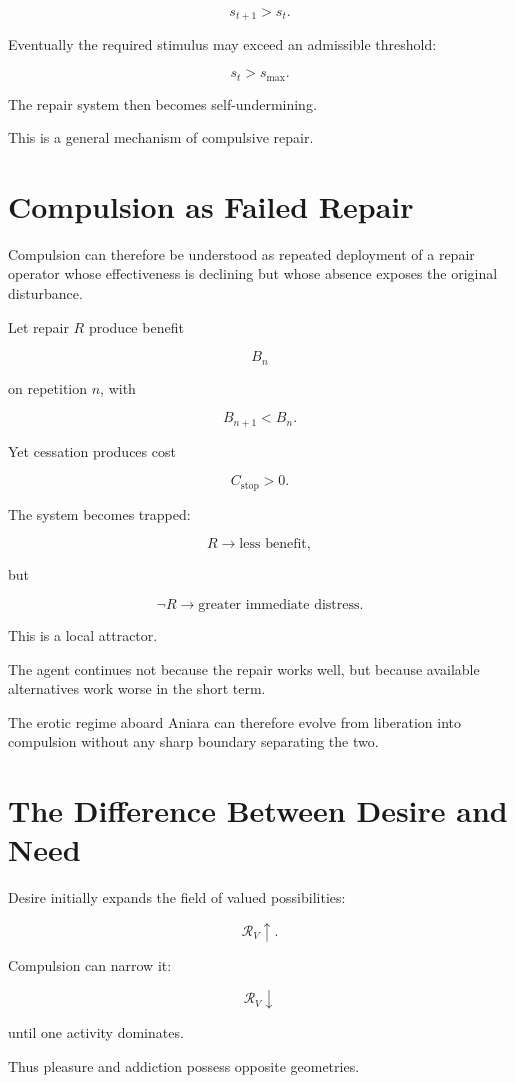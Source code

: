 \documentclass[11pt,oneside]{book}
\theoremstyle{definition}
\theoremstyle{remark}
\newcommand{\R}{\mathcal{R}}
\begin{document}
\[
s_{t+1}>s_t.
\]

Eventually the required stimulus may exceed an admissible threshold:

\[
s_t>s_{\max}.
\]

The repair system then becomes self-undermining.

This is a general mechanism of compulsive repair.

\section{Compulsion as Failed Repair}

Compulsion can therefore be understood as repeated deployment of a repair operator whose effectiveness is declining but whose absence exposes the original disturbance.

Let repair \(R\) produce benefit

\[
B_n
\]

on repetition \(n\), with

\[
B_{n+1}<B_n.
\]

Yet cessation produces cost

\[
C_{\mathrm{stop}}>0.
\]

The system becomes trapped:

\[
R
\rightarrow
\text{less benefit},
\]

but

\[
\neg R
\rightarrow
\text{greater immediate distress}.
\]

This is a local attractor.

The agent continues not because the repair works well, but because available alternatives work worse in the short term.

The erotic regime aboard Aniara can therefore evolve from liberation into compulsion without any sharp boundary separating the two.

\section{The Difference Between Desire and Need}

Desire initially expands the field of valued possibilities:

\[
\R_V\uparrow.
\]

Compulsion can narrow it:

\[
\R_V\downarrow
\]

until one activity dominates.

Thus pleasure and addiction possess opposite geometries.
\end{document}
